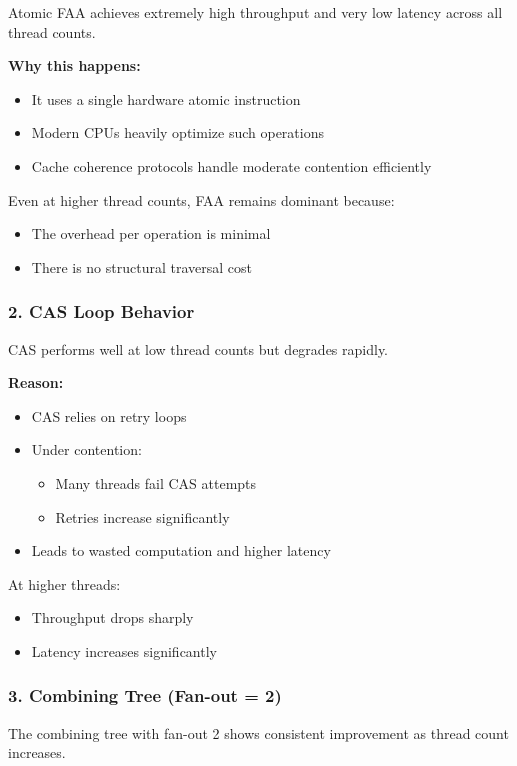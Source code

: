 \documentclass[11pt,a4paper]{article}
\begin{document}
Atomic FAA achieves extremely high throughput and very low latency across all thread counts.

\textbf{Why this happens:}
\begin{itemize}
    \item It uses a single hardware atomic instruction
    \item Modern CPUs heavily optimize such operations
    \item Cache coherence protocols handle moderate contention efficiently
\end{itemize}
Even at higher thread counts, FAA remains dominant because:
\begin{itemize}
    \item The overhead per operation is minimal
    \item There is no structural traversal cost
\end{itemize}

\subsubsection*{2. CAS Loop Behavior}

CAS performs well at low thread counts but degrades rapidly.

\textbf{Reason:}
\begin{itemize}
    \item CAS relies on retry loops
    \item Under contention:
    \begin{itemize}
        \item Many threads fail CAS attempts
        \item Retries increase significantly
    \end{itemize}
    \item Leads to wasted computation and higher latency
\end{itemize}
At higher threads:
\begin{itemize}
    \item Throughput drops sharply
    \item Latency increases significantly
\end{itemize}

\subsubsection*{3. Combining Tree (Fan-out = 2)}

The combining tree with fan-out 2 shows consistent improvement as thread count increases.
\end{document}
